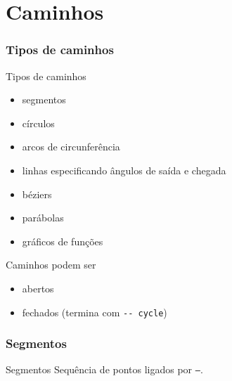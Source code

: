 \section{Caminhos}

\begin{frame}
  \frametitle{Tipos de caminhos}

  \begin{block}{Tipos de caminhos}
    \begin{itemize}
    \item segmentos
    \item círculos
    \item arcos de circunferência
    \item linhas especificando ângulos de saída e chegada
    \item béziers
    \item parábolas
    \item gráficos de funções
    \end{itemize}
  \end{block}

\medskip

\begin{block}
  {Caminhos podem ser}
  \begin{itemize}
  \item abertos
  \item fechados (termina com \texttt{-{}- cycle})
  \end{itemize}
\end{block}
\end{frame}


\begin{frame}
  \frametitle{Segmentos}

  \begin{block}{Segmentos}
    Sequência de pontos ligados por \texttt{--}.
  \end{block}

\begin{exampleblock}{}\small
{}
\medskip

\centering
{}
\end{exampleblock}

\end{frame}






